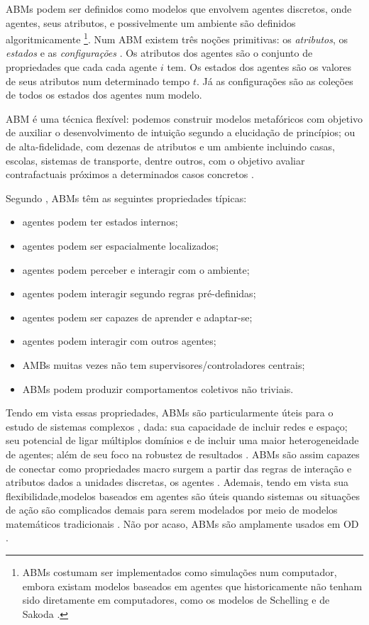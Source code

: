 ABMs podem ser definidos como modelos que envolvem
agentes discretos, onde agentes, seus atributos, e possivelmente um ambiente são
definidos algoritmicamente \cite{sayama2015introduction} \footnote{ ABMs
  costumam ser implementados como simulações num computador, embora existam
  modelos baseados em agentes que historicamente não tenham sido diretamente em
  computadores, como os modelos de Schelling e de Sakoda
  \cite{hegselmann2017thomas}.}. Num ABM existem três noções primitivas: os
\textit{atributos}, os \textit{estados} e as \textit{configurações}
\cite{de2014agent}. Os atributos dos agentes são o conjunto de propriedades
que cada cada agente \(i\) tem. Os estados dos agentes são os valores de seus
atributos num determinado tempo \(t\). Já as configurações são as coleções de
todos os estados dos agentes num modelo.

ABM é uma técnica flexível: podemos construir modelos metafóricos com
objetivo de auxiliar o desenvolvimento de intuição segundo a elucidação de
princípios; ou de alta-fidelidade, com dezenas de atributos e um
ambiente incluindo casas, escolas, sistemas de transporte, dentre outros, com o
objetivo avaliar contrafactuais próximos a determinados casos concretos
\cite{de2014agent, epstein2006generative}.


Segundo , ABMs têm as seguintes
propriedades típicas:
\begin{itemize}
\item agentes podem ter estados internos;
\item agentes podem ser espacialmente localizados;
\item agentes podem perceber e interagir com o ambiente;
\item agentes podem interagir segundo regras pré-definidas;
\item agentes podem ser capazes de aprender e adaptar-se;
\item agentes podem interagir com outros agentes;
\item AMBs muitas vezes não tem supervisores/controladores centrais;
  \item ABMs podem produzir comportamentos coletivos não triviais.
  \end{itemize}

  Tendo em vista essas propriedades, ABMs são particularmente úteis para o
  estudo de sistemas complexos \cite{wilensky2015introduction}, dada: sua
  capacidade de incluir redes e espaço; seu potencial de ligar múltiplos
  domínios e de incluir uma maior heterogeneidade de agentes; além de seu foco
  na robustez de resultados \cite{de2014agent,wilensky2015introduction}. ABMs
  são assim capazes de conectar como propriedades macro surgem a partir das
  regras de interação e atributos dados a unidades discretas, os agentes
  \cite{north2007managing}. Ademais, tendo em vista sua flexibilidade,modelos
  baseados em agentes são úteis quando sistemas ou situações de ação são
  complicados demais para serem modelados por meio de modelos matemáticos
  tradicionais \cite{kollman2003computational}. Não por acaso, ABMs são
  amplamente usados em OD \cite{castellano2012social,flache2017}.

